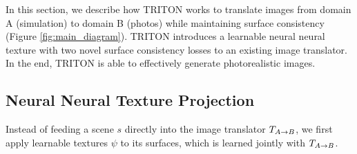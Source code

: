 \documentclass{article}
\begin{document}
		In this section, we describe how TRITON works to translate images from domain A (simulation) to domain B (photos) while maintaining surface consistency (Figure \ref{fig:main_diagram}). 
		TRITON introduces a learnable neural neural texture with two novel surface consistency losses to an existing image translator. In the end, TRITON is able to effectively generate photorealistic images.
\vspace{-3pt}
	\subsection{Neural Neural Texture Projection}
	\label{sec:neural_tex}
	\vspace{-3pt}


		Instead of feeding a scene $s$ directly into the image translator $T_{A\rightarrow B}$, we first apply learnable textures $\psi$ to its surfaces, which is learned jointly with $T_{A\rightarrow B}$. 
		
\end{document}
